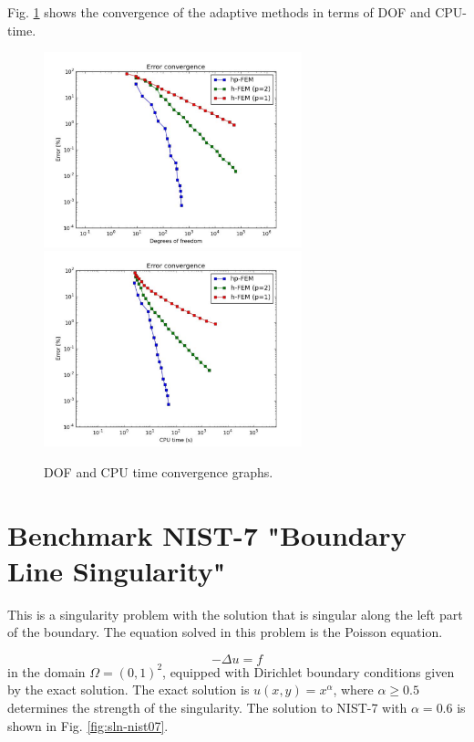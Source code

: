\documentclass[12pt]{elsarticle}
\begin{document}
Fig. \ref{fig:nist-6-conv} shows the convergence of the adaptive methods in terms of DOF and CPU-time.

\begin{figure}[H]
\centering
\hspace{-50mm}
\includegraphics[width=7.5cm]{mafig39.pdf}\ \
\hspace{-10mm}
\includegraphics[width=7.5cm]{mafig40.pdf}
\hspace{-50mm}
\vspace{-2mm}
\caption{DOF and CPU time convergence graphs.}
\label{fig:nist-6-conv}
\end{figure}


\section{Benchmark NIST-7 "Boundary Line Singularity"}
\label{sec:bench-7}

This is a singularity problem with the solution that is singular along the left part of the boundary.
The equation solved in this problem is the Poisson equation.

\begin{equation} \label{boundary-line-singularity}
-\Delta u = f
\end{equation}
in the domain $\Omega = (0, 1)^2$, equipped with Dirichlet boundary conditions
given by the exact solution. The exact solution is
$u(x,y) = x^{\alpha}$,
where $\alpha \geq 0.5$ determines the strength of the singularity.
The solution to NIST-7 with $\alpha = 0.6$ is shown in Fig. \ref{fig:sln-nist07}.
\end{document}
